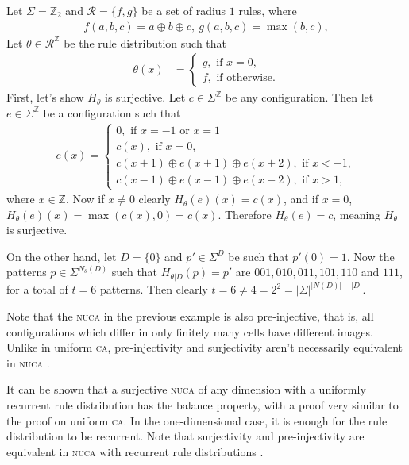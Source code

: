 \documentclass[runningheads]{llncs}
\newcommand{\Z}{\mathbb{Z}}
\newcommand{\R}{\mathcal{R}}
\begin{document}
\begin{example}
Let $\Sigma = \Z_2$ and $\R = \{f,g\}$ be a set of radius $1$ rules, where
\begin{align*}
f(a,b,c) = a \oplus b \oplus c, \:
g(a,b,c) = \max (b,c), 
\end{align*}
Let $\theta \in \R^\Z$ be the rule distribution such that
\begin{align*}
\theta (x) &= \begin{cases}
g, \text{ if } x=0,\\
f, \text{ if } \text{otherwise.}
\end{cases}
\end{align*}
First, let's show $H_\theta$ is surjective. Let $c \in \Sigma^\Z$ be any configuration. Then let $e \in \Sigma^\Z$ be a configuration such that 
\begin{align*}
e(x) = \begin{cases}
0, \text{ if } x=-1 \text{ or } x=1\\
c(x), \text{ if } x=0,\\
c(x+1) \oplus e(x+1) \oplus e(x+2), \text{ if } x < -1,\\
c(x-1) \oplus e(x-1) \oplus e(x-2), \text{ if } x>1,
\end{cases}
\end{align*}
where $x \in \Z$. Now if $x \neq 0$ clearly $H_\theta (e)(x) = c(x)$, and if $x = 0$, $H_\theta (e)(x) = \max (c(x), 0) = c(x)$. Therefore $H_\theta (e) = c$, meaning $H_\theta$ is surjective.

On the other hand, let $D =\{0\}$ and $p' \in \Sigma^D$ be such that $p'(0) = 1$. Now the patterns $p \in \Sigma^{N_\theta(D)}$ such that $H_{\theta|D} (p) = p'$ are $001,010,011,101,110$ and $111$, for a total of $t = 6$ patterns. Then clearly $t = 6 \neq 4 = 2^2 =  |\Sigma|^{|N(D)|-|D|}$. 
\end{example}

Note that the \textsc{nuca} in the previous example is also pre-injective, that is, all configurations which differ in only finitely many cells have different images. Unlike in uniform \textsc{ca}, pre-injectivity and surjectivity aren't necessarily equivalent in \textsc{nuca} \cite{goe}.

It can be shown that a surjective \textsc{nuca} of any dimension with a uniformly recurrent rule distribution has the balance property, with a proof very similar to the proof on uniform \textsc{ca}. In the one-dimensional case, it is enough for the rule distribution to be recurrent. Note that surjectivity and pre-injectivity are equivalent in \textsc{nuca} with recurrent rule distributions \cite{goe}.
\end{document}
